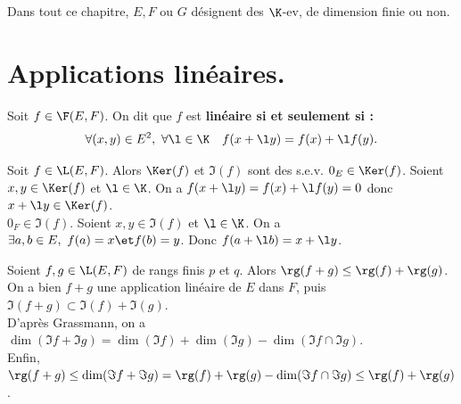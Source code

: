 \documentclass[11pt]{article}
\begin{document}


\thispagestyle{fancy}

Dans tout ce chapitre, $E,F$ ou $G$ désignent des $\K$-ev, de dimension finie ou non.

\vspace*{-0.4cm}

\section{Applications linéaires.}

\begin{defi}{}{}
    Soit $f\in\F(E,F)$. On dit que $f$ est \bf{linéaire} si et seulement si :
    \begin{equation*}
        \forall (x,y) \in E^2, ~ \forall \l \in \K \quad f(x+\l y)=f(x) + \l f(y).
    \end{equation*}
\end{defi}

\begin{prop}{}{}
    Soit $f\in\L(E,F)$. Alors $\Ker(f)$ et $\Im(f)$ sont des s.e.v.
    \tcblower
    \boxed{\Ker} $0_E\in\Ker(f)$. Soient $x,y\in \Ker(f)$ et $\l\in\K$. On a $f(x+\l y) = f(x)+\l f(y)=0$ donc $x+\l y \in \Ker(f)$.\\
    \boxed{\Im} $0_F\in\Im(f)$. Soient $x,y\in\Im(f)$ et $\l\in\K$. On a $\exists a,b\in E, ~ f(a)=x \et f(b)=y$. Donc $f(a+\l b)=x+\l y$.
\end{prop}

\begin{prop}{}{}
    Soient $f,g\in\L(E,F)$ de rangs finis $p$ et $q$. Alors $\rg(f+g)\leq\rg(f)+\rg(g)$.
    \tcblower
    On a bien $f+g$ une application linéaire de $E$ dans $F$, puis $\Im(f+g)\subset\Im(f)+\Im(g)$.\\
    D'après Grassmann, on a $\dim(\Im f + \Im g)=\dim(\Im f) + \dim(\Im g) - \dim(\Im f \cap \Im g)$.\\
    Enfin, $\rg(f+g)\leq\dim(\Im f + \Im g)=\rg(f) + \rg(g)  - \dim(\Im f \cap \Im g)\leq \rg(f) + \rg(g)$.
\end{prop}
\end{document}
